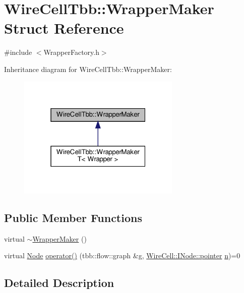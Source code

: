 \hypertarget{struct_wire_cell_tbb_1_1_wrapper_maker}{}\section{Wire\+Cell\+Tbb\+:\+:Wrapper\+Maker Struct Reference}
\label{struct_wire_cell_tbb_1_1_wrapper_maker}


{\ttfamily \#include $<$Wrapper\+Factory.\+h$>$}



Inheritance diagram for Wire\+Cell\+Tbb\+:\+:Wrapper\+Maker\+:
\nopagebreak
\begin{figure}[H]
\begin{center}
\leavevmode
\includegraphics[width=220pt]{struct_wire_cell_tbb_1_1_wrapper_maker__inherit__graph}
\end{center}
\end{figure}
\subsection*{Public Member Functions}
\begin{DoxyCompactItemize}
\item 
virtual \hyperlink{struct_wire_cell_tbb_1_1_wrapper_maker_a7f76e2a875975d1f8b90a5f1783b448b}{$\sim$\+Wrapper\+Maker} ()
\item 
virtual \hyperlink{namespace_wire_cell_tbb_aa7b6ff37a20e0174babf0614286bb59f}{Node} \hyperlink{struct_wire_cell_tbb_1_1_wrapper_maker_a65fa28063bf58c1358a2fc602d42cb42}{operator()} (tbb\+::flow\+::graph \&g, \hyperlink{class_wire_cell_1_1_interface_a09c548fb8266cfa39afb2e74a4615c37}{Wire\+Cell\+::\+I\+Node\+::pointer} \hyperlink{format_8h_a9ab7e5832cef391eb8b1505a601fb215}{n})=0
\end{DoxyCompactItemize}


\subsection{Detailed Description}


